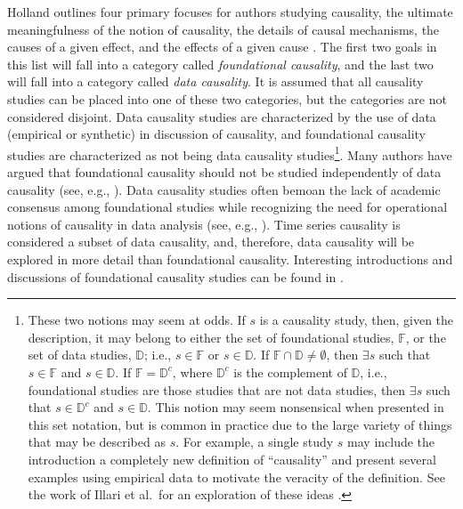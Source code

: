 Holland outlines four primary focuses for authors studying causality, the ultimate meaningfulness of the notion of causality, the details of causal mechanisms, the causes of a given effect, and the effects of a given cause \cite{Holland1986}.  The first two goals in this list will fall into a category called {\em foundational causality}, and the last two will fall into a category called {\em data causality}.  It is assumed that all causality studies can be placed into one of these two categories, but the categories are not considered disjoint.  Data causality studies are characterized by the use of data (empirical or synthetic) in discussion of causality, and foundational causality studies are characterized as not being data causality studies\footnote{These two notions may seem at odds.  If $s$ is a causality study, then, given the description, it may belong to either the set of foundational studies, $\mathbb{F}$, or the set of data studies, $\mathbb{D}$; i.e., $s\in\mathbb{F}$ or $s\in\mathbb{D}$.  If $\mathbb{F}\cap\mathbb{D}\neq\emptyset$, then $\exists s$ such that $s\in\mathbb{F}$ and $s\in\mathbb{D}$.  If $\mathbb{F}=\mathbb{D}^c$, where $\mathbb{D}^c$ is the complement of $\mathbb{D}$, i.e., foundational studies are those studies that are not data studies, then $\exists s$ such that $s\in\mathbb{D}^c$ and $s\in\mathbb{D}$.  This notion may seem nonsensical when presented in this set notation, but is common in practice due to the large variety of things that may be described as $s$.  For example, a single study $s$ may include the introduction a completely new definition of ``causality'' and present several examples using empirical data to motivate the veracity of the definition.  See the work of Illari et al.\ for an exploration of these ideas \cite{Illari2014,Illari2011b}.}.  Many authors have argued that foundational causality should not be studied independently of data causality (see, e.g., \cite{Holland1986,Granger2003,Plotnitsky2011,Zellner2007,Zellner1979,Zellner1988,Bohm1971}).  Data causality studies often bemoan the lack of academic consensus among foundational studies while recognizing the need for operational notions of causality in data analysis (see, e.g., \cite{Shugan2007,Granger1980,Zheng2010,Pearl2000,Druzdzel1993}).  Time series causality is considered a subset of data causality, and, therefore, data causality will be explored in more detail than foundational causality.  Interesting introductions and discussions of foundational causality studies can be found in \cite{Pearl2000,Illari2014,Kleinberg2012,Bunge1979,Bohm1971,Imbens2015}.  

